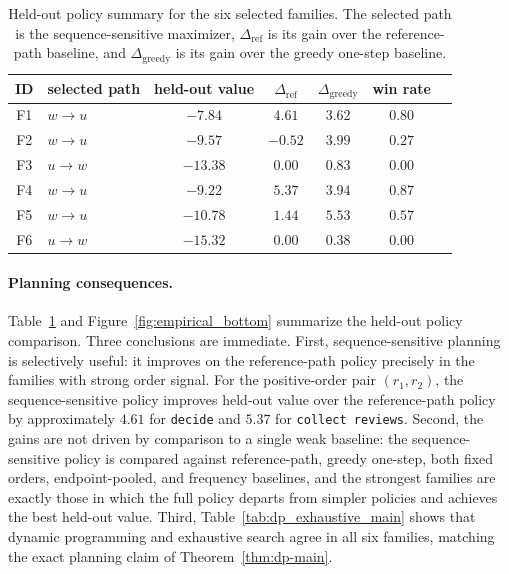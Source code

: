 \documentclass{article}
\theoremstyle{definition}
\begin{document}
\begin{table}[t]
\centering
\footnotesize
\begin{tabular}{clccccc}
\toprule
ID & selected path & held-out value & $\Delta_{\mathrm{ref}}$ & $\Delta_{\mathrm{greedy}}$ & win rate \\
\midrule
F1 & $w\!\to\!u$ & $-7.84$ & $4.61$ & $3.62$ & $0.80$ \\
F2 & $w\!\to\!u$ & $-9.57$ & $-0.52$ & $3.99$ & $0.27$ \\
F3 & $u\!\to\!w$ & $-13.38$ & $0.00$ & $0.83$ & $0.00$ \\
F4 & $w\!\to\!u$ & $-9.22$ & $5.37$ & $3.94$ & $0.87$ \\
F5 & $w\!\to\!u$ & $-10.78$ & $1.44$ & $5.53$ & $0.57$ \\
F6 & $u\!\to\!w$ & $-15.32$ & $0.00$ & $0.38$ & $0.00$ \\
\bottomrule
\end{tabular}

\caption{Held-out policy summary for the six selected families. The selected path is the sequence-sensitive maximizer, $\Delta_{\mathrm{ref}}$ is its gain over the reference-path baseline, and $\Delta_{\mathrm{greedy}}$ is its gain over the greedy one-step baseline.}
\label{tab:policy_summary_main}
\end{table}

\paragraph{Planning consequences.}
Table~\ref{tab:policy_summary_main} and Figure~\ref{fig:empirical_bottom} summarize the held-out policy comparison. Three conclusions are immediate. First, sequence-sensitive planning is selectively useful: it improves on the reference-path policy precisely in the families with strong order signal. For the positive-order pair $(r_1,r_2)$, the sequence-sensitive policy improves held-out value over the reference-path policy by approximately $4.61$ for \texttt{decide} and $5.37$ for \texttt{collect reviews}. Second, the gains are not driven by comparison to a single weak baseline: the sequence-sensitive policy is compared against reference-path, greedy one-step, both fixed orders, endpoint-pooled, and frequency baselines, and the strongest families are exactly those in which the full policy departs from simpler policies and achieves the best held-out value. Third, Table~\ref{tab:dp_exhaustive_main} shows that dynamic programming and exhaustive search agree in all six families, matching the exact planning claim of Theorem~\ref{thm:dp-main}.
\end{document}
